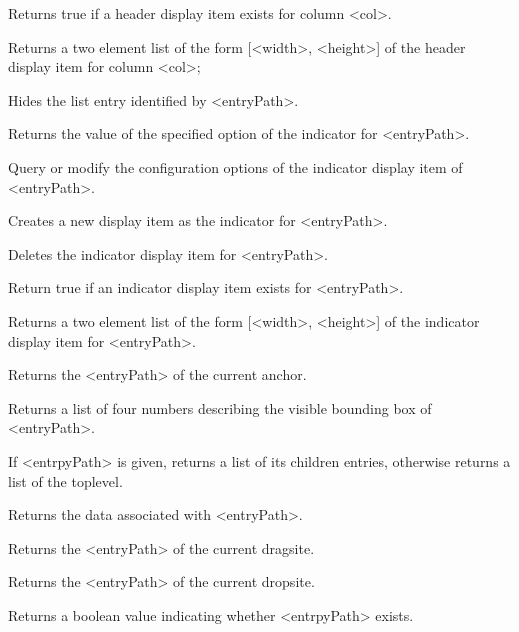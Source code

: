 \begin{enum}{1cm}
Returns true if a header display item exists for column <col>.

Returns a two element list of the form [<width>, <height>] of the header display item for column <col>;

Hides the list entry identified by <entryPath>. 

Returns the value of the specified option of the indicator for <entryPath>.

Query or modify the configuration options of the indicator display item of <entryPath>.

Creates a new display item as the indicator for <entryPath>.

Deletes the indicator display item for <entryPath>. 

Return true if an indicator display item exists for <entryPath>.

Returns a two element list of the form [<width>, <height>] of the indicator display item for <entryPath>.

Returns the <entryPath> of the current anchor.

Returns a list of four numbers describing the visible bounding box of <entryPath>.

If <entrpyPath> is given, returns a list of its children entries,  otherwise returns a list of the toplevel. 

Returns the data associated with <entryPath>. 

Returns the <entryPath> of the current dragsite.

Returns the <entryPath> of the current dropsite.

Returns a boolean value indicating whether <entrpyPath> exists. 


\end{enum}
